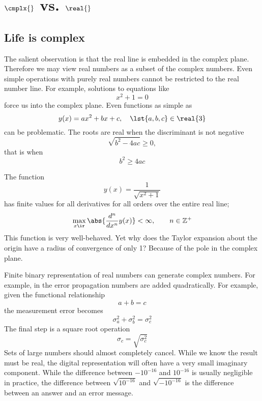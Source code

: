 \chapter{$\cmplx{}$ vs. $\real{}$}

\section{Life is complex}
The salient observation is that the real line is embedded in the complex plane. Therefore we may view real numbers as a subset of the complex numbers. Even simple operations with purely real numbers cannot be restricted to the real number line. For example, solutions to equations like
\begin{equation}
  x^{2} + 1 = 0
\end{equation}
force us into the complex plane. Even functions as simple as
\begin{equation}
  y(x) = a x^{2} + b x + c, \quad \lst{a,b,c}\in\real{3}
\end{equation}
can be problematic. The roots are real when the discriminant is not negative
\begin{equation}
  \sqrt{b^{2} - 4 a c} \ge 0,
\end{equation}
that is when
\begin{equation}
  b^{2} \ge 4 ac
\end{equation}

The function
\begin{equation}
  y(x) = \frac{1} {\sqrt{x^{2} + 1}}
\end{equation}
has finite values for all derivatives for all orders over the entire real line;\begin{equation}
  \max_{x\ir}\abs{\frac{d^{n}} {dx^{n}} y(x)} < \infty, \qquad n \in \mathbb{Z}^{+}
\end{equation}
This function is very well-behaved. Yet why does the Taylor expansion about the origin have a radius of convergence of only 1? Because of the pole in the complex plane.

Finite binary representation of real numbers can generate complex numbers. For example, in the error propagation numbers are added quadratically. For example, given the functional relationship
\begin{equation}
  a + b = c
\end{equation}
the measurement error becomes
\begin{equation}
  \sigma_{a}^{2} + \sigma_{b}^{2} = \sigma_{c}^{2}
\end{equation}
The final step is a square root operation
\begin{equation}
  \sigma_{c} = \sqrt{\sigma_{c}^{2}}
\end{equation}
Sets of large numbers should almost completely cancel. While we know the result must be real, the digital representation will often have a very small imaginary component. While the difference between $-10^{-16}$ and $10^{-16}$ is usually negligible in practice, the difference between $\sqrt{10^{-16}}$ and $\sqrt{-10^{-16}}$ is the difference between an answer and an error message.

